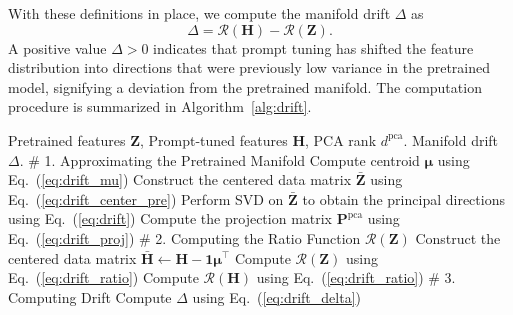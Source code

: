 \documentclass{article}
\theoremstyle{plain}
\theoremstyle{definition}
\theoremstyle{remark}
\begin{document}
	With these definitions in place, we compute the manifold drift $\Delta$ as
	\begin{equation}
		\Delta = \mathcal{R}(\mathbf{H}) - \mathcal{R}(\mathbf{Z}).
		\label{eq:drift_delta}
	\end{equation}
	A positive value $\Delta>0$ indicates that prompt tuning has shifted the feature distribution into directions that were previously low variance in the pretrained model, signifying a deviation from the pretrained manifold. The computation procedure is summarized in Algorithm~\ref{alg:drift}.
	\begin{algorithm}[h]
		\caption{Computation of Manifold Drift $\Delta$}
		\label{alg:drift}
		\begin{algorithmic}[1]
			 Pretrained features $\mathbf{Z}$, Prompt-tuned features $\mathbf{H}$, PCA rank $d^{\mathrm{pca}}$.
			 Manifold drift $\Delta$.
			\STATE \# 1. Approximating the Pretrained Manifold
			\STATE Compute centroid $\boldsymbol{\mu}$ using Eq.~(\ref{eq:drift_mu})
			\STATE Construct the centered data matrix $\bar{\mathbf{Z}}$ using Eq.~(\ref{eq:drift_center_pre})
			\STATE Perform SVD on $\bar{\mathbf{Z}}$ to obtain the principal directions using Eq.~(\ref{eq:drift})
			\STATE Compute the projection matrix $\mathbf{P}^{\mathrm{pca}}$ using Eq.~(\ref{eq:drift_proj})
			\STATE \# 2. Computing the Ratio Function $\mathcal{R}(\mathbf{Z})$
			\STATE Construct the centered data matrix $\bar{\mathbf{H}} \leftarrow \mathbf{H} - \mathbf{1}\boldsymbol{\mu}^\top$
			\STATE Compute $\mathcal{R}(\mathbf{Z})$ using Eq.~(\ref{eq:drift_ratio})
			\STATE Compute $\mathcal{R}(\mathbf{H})$ using Eq.~(\ref{eq:drift_ratio})
			\STATE \# 3. Computing Drift
			\STATE Compute $\Delta$ using Eq.~(\ref{eq:drift_delta})
		\end{algorithmic}
	\end{algorithm}
\end{document}
